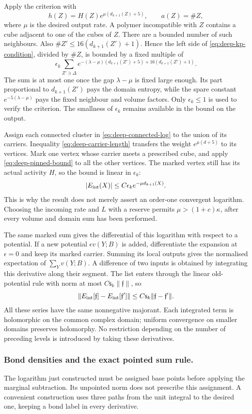 \documentclass[11pt,letterpaper,reqno]{amsart}
\theoremstyle{definition}
\theoremstyle{remark}
\begin{document}
Apply the criterion with
\[
 h(Z)=H(Z)e^{\mu(d_{k+1}(Z)+5)},\qquad a(Z)=\#Z,
\]
where $\mu$ is the desired output rate. A polymer incompatible
with $Z$ contains a cube adjacent to one of the cubes of $Z$.
There are a bounded number of such neighbours. Also
$\#Z'\le16(d_{k+1}(Z')+1)$. Hence the left side of
\eqref{eq:deep-kp-condition}, divided by $\#Z$, is bounded
by a fixed multiple of
\[
 \epsilon_k\sum_{Z'\ni\Delta}
 e^{-(\lambda-\mu)(d_{k+1}(Z')+5)+16(d_{k+1}(Z')+1)}.
\]
The sum is at most one once the gap $\lambda-\mu$ is fixed
large enough. Its part proportional to $d_{k+1}(Z')$ pays
the domain entropy, while the spare constant
$e^{-5(\lambda-\mu)}$ pays the fixed neighbour and volume
factors. Only $\epsilon_k\le1$ is used to verify the criterion.
The smallness of $\epsilon_k$ remains available in the bound
on the output.

Assign each connected cluster in
\eqref{eq:deep-connected-log} to the union of its carriers.
Inequality \eqref{eq:deep-carrier-length} transfers the weight
$e^{\mu(d+5)}$ to its vertices. Mark one vertex whose carrier
meets a prescribed cube, and apply
\eqref{eq:deep-pinned-bound} to all the other vertices. The
marked vertex still has its actual activity $H$, so the bound
is linear in $\epsilon_k$:
\[
 |E_{\rm int}(X)|\le C\epsilon_k e^{-\mu d_{k+1}(X)}.
\]
This is why the result does not merely assert an order-one
convergent logarithm. Choosing the incoming rate and $L$ with
a reserve permits $\mu>(1+c)\kappa$, after every volume and
domain sum has been performed.

The same marked sum gives the differential of this logarithm
with respect to a potential. If a new potential
$\epsilon v(Y;B)$ is added, differentiate the expansion at
$\epsilon=0$ and keep its marked carrier. Summing its local
outputs gives the normalised expectation of $\sum_Yv(Y;B)$.
A difference of two inputs is obtained by integrating this
derivative along their segment. The list enters through the
linear old-potential rule with norm at most
$C\mathsf s_k\|\mathfrak f\|$, so
\[
 \|E_{\rm int}[\mathfrak f]-E_{\rm int}[\mathfrak f']\|
                 \le C\mathsf s_k\|\mathfrak f-\mathfrak f'\|.
\]
All these series have the same nonnegative majorant. Each
integrated term is holomorphic on the common complex domain;
uniform convergence on smaller domains preserves holomorphy.
No restriction depending on the number of preceding levels
is introduced by taking these derivatives.

\subsubsection*{Bond densities and the exact pointed sum rule.}
The logarithm just constructed must be assigned base points
before applying the marginal subtraction. Its unpointed norm
does not prescribe this assignment. A convenient construction
uses three paths from the unit integral to the desired one,
keeping a bond label in every derivative.
\end{document}
